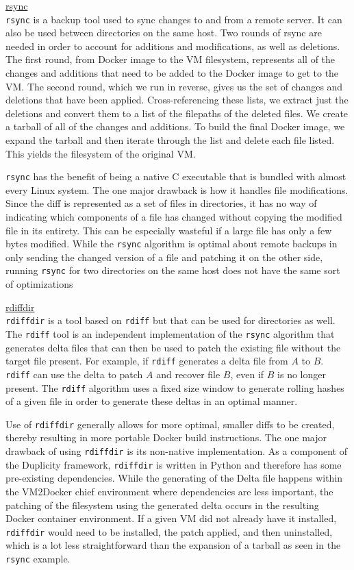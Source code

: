 \underline{rsync}\\
\texttt{rsync} is a backup tool used to sync changes to and from a remote server. It can also be used between directories on the same host. Two rounds of rsync are needed in order to account for additions and modifications, as well as deletions. The first round, from Docker image to the VM filesystem, represents all of the changes and additions that need to be added to the Docker image to get to the VM. The second round, which we run in reverse, gives us the set of changes and deletions that have been applied. Cross-referencing these lists, we extract just the deletions and convert them to a list of the filepaths of the deleted files. We create a tarball of all of the changes and additions. To build the final Docker image, we expand the tarball and then iterate through the list and delete each file listed. This yields the filesystem of the original VM. 

\texttt{rsync} has the benefit of being a native C executable that is bundled with almost  every Linux system. The one major drawback is how it handles file modifications. Since the diff is represented as a set of files in directories, it has no way of indicating which components of a file has changed without copying the modified file in its entirety. This can be especially wasteful if a large file has only a few bytes modified. While the \texttt{rsync} algorithm is optimal about remote backups in only sending the changed version of a file and patching it on the other side, running \texttt{rsync} for two directories on the same host does not have the same sort of optimizations

\underline{rdiffdir}\\
\label{sec:rdiffdir}
\texttt{rdiffdir} is a tool based on \texttt{rdiff} but that can be used for directories as well. The \texttt{rdiff} tool is an independent implementation of the \texttt{rsync} algorithm that generates delta files that can then be used to patch the existing file without the target file present. For example, if \texttt{rdiff} generates a delta file from $A$ to $B$. \texttt{rdiff} can use the delta to patch $A$ and recover file $B$, even if $B$ is no longer present. The \texttt{rdiff} algorithm uses a fixed size window to generate rolling hashes of a given file in order to generate these deltas in an optimal manner.

Use of \texttt{rdiffdir} generally allows for more optimal, smaller diffs to be created, thereby resulting in more portable Docker build instructions. The one major drawback of using \texttt{rdiffdir} is its non-native implementation. As a component of the Duplicity framework, \texttt{rdiffdir} is written in Python and therefore has some pre-existing dependencies. While the generating of the Delta file happens within the VM2Docker chief environment where dependencies are less important, the patching of the filesystem using the generated delta occurs in the resulting Docker container environment. If a given VM did not already have it installed, \texttt{rdiffdir} would need to be installed, the patch applied, and then uninstalled, which is a lot less straightforward than the expansion of a tarball as seen in the \texttt{rsync} example.


